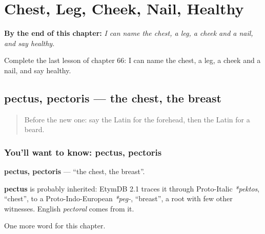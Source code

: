
\chapter{Chest, Leg, Cheek, Nail, Healthy}
\label{ch:la-chest-leg-cheek-nail-healthy}

\begin{chapteropening}
\textbf{By the end of this chapter:} \emph{I can name the chest, a leg, a cheek and a nail, and say healthy.}

Complete the last lesson of chapter 66: I can name the chest, a leg, a cheek and a nail, and say healthy.
\end{chapteropening}

\section[pectus, pectoris]{pectus, pectoris — the chest, the breast}

\label{lesson:LA-C66-pectus}



\begin{quote}
Before the new one: say the Latin for the forehead, then the Latin for a beard.
\end{quote}

\subsection*{You'll want to know: pectus, pectoris}
\textbf{pectus, pectoris} — \textquotedblleft{}the chest, the breast\textquotedblright{}.

\begin{cousinweb}
\textbf{pectus} is probably inherited: EtymDB 2.1 traces it through Proto-Italic \emph{*pektos}, \textquotedblleft{}chest\textquotedblright{}, to a Proto-Indo-European \emph{*peg-}, \textquotedblleft{}breast\textquotedblright{}, a root with few other witnesses. English \emph{pectoral} comes from it.
\end{cousinweb}

\begin{grammarlens}[title={What you've built}]
One more word for this chapter.
\end{grammarlens}

